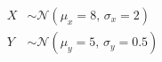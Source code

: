 \documentclass[preview]{standalone}
\begin{document}
\begin{align*}
X &\sim \mathcal{N}(\mu_{x} = 8,\,\sigma_{x} = 2) \\Y &\sim \mathcal{N}(\mu_{y} = 5,\,\sigma_{y} = 0.5)
\end{align*}
\end{document}
